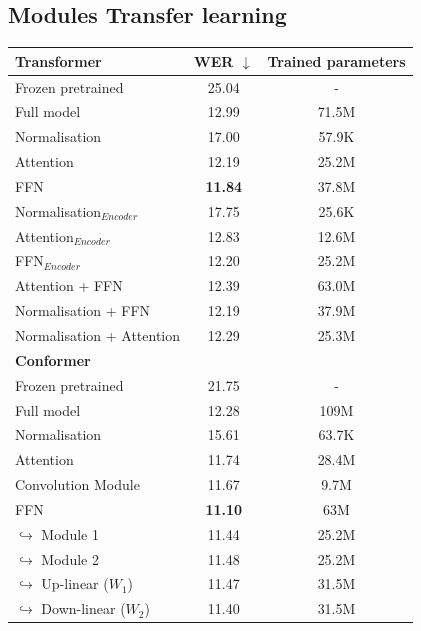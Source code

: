 \subsection{Modules Transfer learning}
\begin{table}[h]
    \begin{center}
        \begin{tabular}{lcc}\hline
            \textbf{Transformer}    & WER  $\downarrow$   & Trained parameters \\ \hline
            Frozen pretrained & 25.04 & -   \\
            Full model   & 12.99 & 71.5M   \\ \hline
            Normalisation & 17.00 & 57.9K  \\
            Attention & 12.19 & 25.2M  \\
            FFN    & \textbf{11.84}     &  37.8M \\ \hline
            Normalisation$_{Encoder}$ & 17.75 & 25.6K \\ 
            Attention$_{Encoder}$ & 12.83 & 12.6M \\ 
            FFN$_{Encoder}$ & 12.20 & 25.2M \\ \hline 
            Attention + FFN & 12.39 & 63.0M \\
            Normalisation + FFN & 12.19 & 37.9M \\
            Normalisation + Attention & 12.29 & 25.3M\\ \hline \hline
            \textbf{Conformer}    &     & \\ \hline
            Frozen pretrained & 21.75 & -   \\
            Full model   & 12.28 & 109M   \\ \hline
            Normalisation & 15.61 & 63.7K  \\
            Attention & 11.74 & 28.4M  \\
            Convolution Module & 11.67 & 9.7M \\
            FFN    & \textbf{11.10}     &  63M \\
            \quad $\hookrightarrow$ Module 1    & 11.44     &  25.2M \\
            \quad $\hookrightarrow$ Module 2    & 11.48     &  25.2M \\
            \quad $\hookrightarrow$ Up-linear ($W_1$)    & 11.47     &  31.5M \\
            \quad $\hookrightarrow$ Down-linear ($W_2$)    & 11.40     &  31.5M \\ \hline

\end{tabular}
\end{center}
\end{table}
